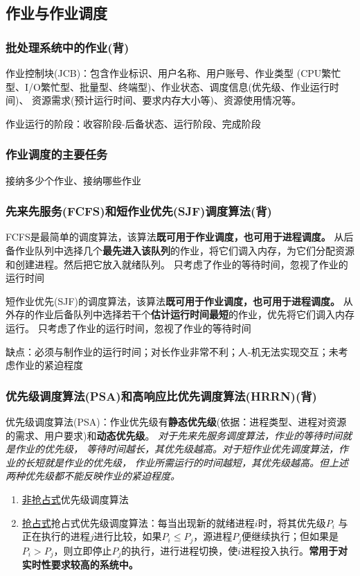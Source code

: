 \documentclass{article}
\begin{document}
\subsection{作业与作业调度}
\subsubsection{{\color{red}批处理系统中的作业}{\color{green}(背)}}

作业控制块(JCB)：包含作业标识、用户名称、用户账号、作业类型
(CPU繁忙型、I/O繁忙型、批量型、终端型)、作业状态、调度信息(优先级、作业运行时间)、
资源需求(预计运行时间、要求内存大小等)、资源使用情况等。

作业运行的阶段：收容阶段-后备状态、运行阶段、完成阶段
\subsubsection{作业调度的主要任务}
接纳多少个作业、接纳哪些作业
\subsubsection{{\color{red}先来先服务(FCFS)和短作业优先(SJF)调度算法}{\color{green}(背)}}
FCFS是最简单的调度算法，该算法\textbf{既可用于作业调度，也可用于进程调度。}
从后备作业队列中选择几个\textbf{最先进入该队列}的作业，将它们调入内存，为它们分配资源和创建进程。然后把它放入就绪队列。
{\color{red}只考虑了作业的等待时间，忽视了作业的运行时间}


短作业优先(SJF)的调度算法，该算法\textbf{既可用于作业调度，也可用于进程调度。}
从外存的作业后备队列中选择若干个\textbf{估计运行时间最短}的作业，优先将它们调入内存运行。
{\color{red}只考虑了作业的运行时间，忽视了作业的等待时间}


缺点：必须与制作业的运行时间；对长作业非常不利；人-机无法实现交互；未考虑作业的紧迫程度
\subsubsection{{\color{red}优先级调度算法(PSA)和高响应比优先调度算法(HRRN)}{\color{green}(背)}}
\label{优先级调度算法}优先级调度算法(PSA)：作业优先级有\textbf{静态优先级}(依据：进程类型、进程对资源的需求、用户要求)和\textbf{动态优先级}。
\textit{对于先来先服务调度算法，作业的等待时间就是作业的优先级，
等待时间越长，其优先级越高。对于短作业优先调度算法，作业的长短就是作业的优先级，
作业所需运行的时间越短，其优先级越高。但上述两种优先级都不能反映作业的紧迫程度。}
\vspace*{-0.2cm}
\begin{enumerate}
    \item \hyperref[非抢占式]{非抢占式}优先级调度算法
    \item \hyperref[抢占式]{抢占式}抢占式优先级调度算法：每当出现新的就绪进程$i$时，将其优先级$P_i$
    与正在执行的进程$j$进行比较，如果$P_i \leq P_j$，源进程$P_j$便继续执行；但如果是
    $P_i > P_j$，则立即停止$P_j$的执行，进行进程切换，使$i$进程投入执行。\textbf{常用于对实时性要求较高的系统中。}
\end{enumerate}
\vspace*{1cm}
\end{document}

